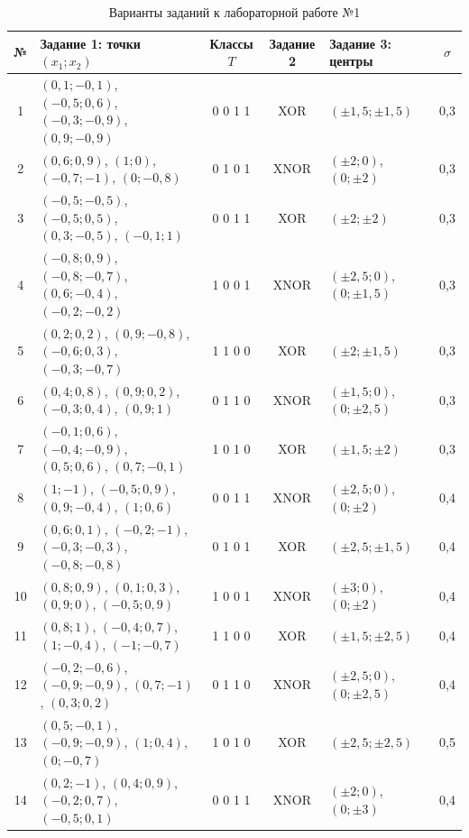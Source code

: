 \begin{table}[!htb]
\caption{Варианты заданий к лабораторной работе №1}
\label{tab:l1-var}
\centering\footnotesize\setlength{\tabcolsep}{3.5pt}
\begin{tabular}{clcclc}
\toprule
№ & Задание 1: точки $(x_1; x_2)$ & Классы $T$ & Задание 2 & Задание 3: центры & $\sigma$ \\
\midrule
1 & $(0,1; -0,1)$, $(-0,5; 0,6)$, $(-0,3; -0,9)$, $(0,9; -0,9)$ & 0 0 1 1 & XOR & $(\pm 1,5; \pm 1,5)$ & 0,3 \\
2 & $(0,6; 0,9)$, $(1; 0)$, $(-0,7; -1)$, $(0; -0,8)$ & 0 1 0 1 & XNOR & $(\pm 2; 0)$, $(0; \pm 2)$ & 0,3 \\
3 & $(-0,5; -0,5)$, $(-0,5; 0,5)$, $(0,3; -0,5)$, $(-0,1; 1)$ & 0 0 1 1 & XOR & $(\pm 2; \pm 2)$ & 0,3 \\
4 & $(-0,8; 0,9)$, $(-0,8; -0,7)$, $(0,6; -0,4)$, $(-0,2; -0,2)$ & 1 0 0 1 & XNOR & $(\pm 2,5; 0)$, $(0; \pm 1,5)$ & 0,3 \\
5 & $(0,2; 0,2)$, $(0,9; -0,8)$, $(-0,6; 0,3)$, $(-0,3; -0,7)$ & 1 1 0 0 & XOR & $(\pm 2; \pm 1,5)$ & 0,3 \\
6 & $(0,4; 0,8)$, $(0,9; 0,2)$, $(-0,3; 0,4)$, $(0,9; 1)$ & 0 1 1 0 & XNOR & $(\pm 1,5; 0)$, $(0; \pm 2,5)$ & 0,3 \\
7 & $(-0,1; 0,6)$, $(-0,4; -0,9)$, $(0,5; 0,6)$, $(0,7; -0,1)$ & 1 0 1 0 & XOR & $(\pm 1,5; \pm 2)$ & 0,3 \\
8 & $(1; -1)$, $(-0,5; 0,9)$, $(0,9; -0,4)$, $(1; 0,6)$ & 0 0 1 1 & XNOR & $(\pm 2,5; 0)$, $(0; \pm 2)$ & 0,4 \\
9 & $(0,6; 0,1)$, $(-0,2; -1)$, $(-0,3; -0,3)$, $(-0,8; -0,8)$ & 0 1 0 1 & XOR & $(\pm 2,5; \pm 1,5)$ & 0,4 \\
10 & $(0,8; 0,9)$, $(0,1; 0,3)$, $(0,9; 0)$, $(-0,5; 0,9)$ & 1 0 0 1 & XNOR & $(\pm 3; 0)$, $(0; \pm 2)$ & 0,4 \\
11 & $(0,8; 1)$, $(-0,4; 0,7)$, $(1; -0,4)$, $(-1; -0,7)$ & 1 1 0 0 & XOR & $(\pm 1,5; \pm 2,5)$ & 0,4 \\
12 & $(-0,2; -0,6)$, $(-0,9; -0,9)$, $(0,7; -1)$, $(0,3; 0,2)$ & 0 1 1 0 & XNOR & $(\pm 2,5; 0)$, $(0; \pm 2,5)$ & 0,4 \\
13 & $(0,5; -0,1)$, $(-0,9; -0,9)$, $(1; 0,4)$, $(0; -0,7)$ & 1 0 1 0 & XOR & $(\pm 2,5; \pm 2,5)$ & 0,5 \\
14 & $(0,2; -1)$, $(0,4; 0,9)$, $(-0,2; 0,7)$, $(-0,5; 0,1)$ & 0 0 1 1 & XNOR & $(\pm 2; 0)$, $(0; \pm 3)$ & 0,4 \\
\bottomrule
\end{tabular}
\end{table}

